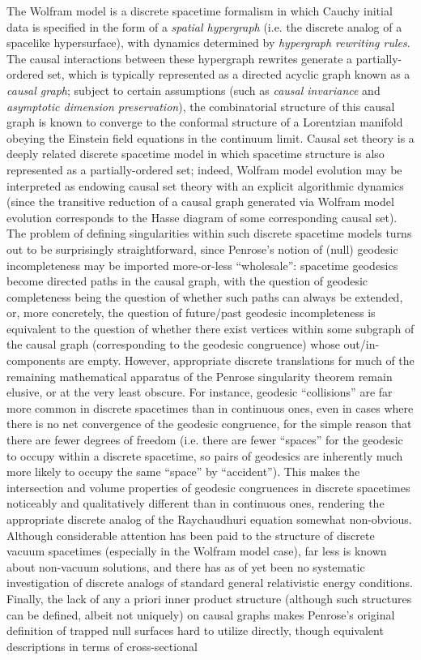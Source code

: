 \documentclass{article}
\begin{document}
The Wolfram model is a discrete spacetime formalism in which Cauchy initial data is specified in the form of a \textit{spatial hypergraph} (i.e. the discrete analog of a spacelike hypersurface), with dynamics determined by \textit{hypergraph rewriting rules}. The causal interactions between these hypergraph rewrites generate a partially-ordered set, which is typically represented as a directed acyclic graph known as a \textit{causal graph}; subject to certain assumptions (such as \textit{causal invariance} and \textit{asymptotic dimension preservation}), the combinatorial structure of this causal graph is known to converge to the conformal structure of a Lorentzian manifold obeying the Einstein field equations in the continuum limit\cite{gorard}\cite{gorard4}. Causal set theory is a deeply related discrete spacetime model in which spacetime structure is also represented as a partially-ordered set; indeed, Wolfram model evolution may be interpreted as endowing causal set theory with an explicit algorithmic dynamics\cite{bolognesi}\cite{bolognesi2}\cite{gorard3} (since the transitive reduction of a causal graph generated via Wolfram model evolution corresponds to the Hasse diagram of some corresponding causal set). The problem of defining singularities within such discrete spacetime models turns out to be surprisingly straightforward, since Penrose's notion of (null) geodesic incompleteness may be imported more-or-less ``wholesale'': spacetime geodesics become directed paths in the causal graph, with the question of geodesic completeness being the question of whether such paths can always be extended, or, more concretely, the question of future/past geodesic incompleteness is equivalent to the question of whether there exist vertices within some subgraph of the causal graph (corresponding to the geodesic congruence) whose out/in-components are empty. However, appropriate discrete translations for much of the remaining mathematical apparatus of the Penrose singularity theorem remain elusive, or at the very least obscure. For instance, geodesic ``collisions'' are far more common in discrete spacetimes than in continuous ones, even in cases where there is no net convergence of the geodesic congruence, for the simple reason that there are fewer degrees of freedom (i.e. there are fewer ``spaces'' for the geodesic to occupy within a discrete spacetime, so pairs of geodesics are inherently much more likely to occupy the same ``space'' by ``accident''). This makes the intersection and volume properties of geodesic congruences in discrete spacetimes noticeably and qualitatively different than in continuous ones, rendering the appropriate discrete analog of the Raychaudhuri equation somewhat non-obvious. Although considerable attention has been paid to the structure of discrete vacuum spacetimes (especially in the Wolfram model case), far less is known about non-vacuum solutions, and there has as of yet been no systematic investigation of discrete analogs of standard general relativistic energy conditions. Finally, the lack of any a priori inner product structure (although such structures can be defined, albeit not uniquely) on causal graphs makes Penrose's original definition of trapped null surfaces hard to utilize directly, though equivalent descriptions in terms of cross-sectional 
\end{document}
